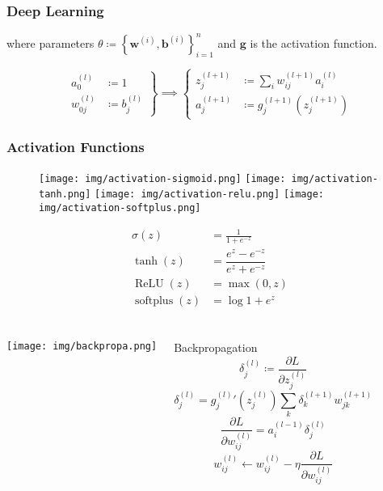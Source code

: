 \documentclass[UTF8,11pt,colorlinks,compress,openany]{beamer}%
\begin{document}
\begin{frame}\frametitle{Deep Learning}
	\begin{center}
	\end{center}
	where parameters $\theta\coloneqq \left\{\mathbf{w}^{(i)},\mathbf{b}^{(i)}\right\}_{i=1}^n$ and $\mathbf{g}$ is the activation function.
	\begin{block}{}
		\[
		\left.\begin{aligned}
		a_0^{(l)}&\coloneqq 1\\
		w_{0j}^{(l)}&\coloneqq b_j^{(l)}
		\end{aligned}\right\}\implies\left\{
		\begin{aligned}
		z_j^{(l+1)}&\coloneqq \sum\limits_i w_{ij}^{(l+1)}a_i^{(l)}\\
		a_j^{(l+1)}&\coloneqq g_j^{(l+1)}\left(z_j^{(l+1)}\right)
		\end{aligned}\right.
		\]
	\end{block}
\end{frame}

\begin{frame}\frametitle{Activation Functions}
\begin{figure}[H]
\texttt{[image: img/activation-sigmoid.png]}
\texttt{[image: img/activation-tanh.png]}
\texttt{[image: img/activation-relu.png]}
\texttt{[image: img/activation-softplus.png]}
\end{figure}
\begin{align*}
\sigma(z)&=\frac{1}{1+e^{-z}}\\
\tanh(z)&=\dfrac{e^z-e^{-z}}{e^z+e^{-z}}\\
\operatorname{ReLU}(z)&=\max(0,z)\\
\operatorname{softplus}(z)&=\log 1+e^z
\end{align*}
\end{frame}

\begin{frame}\frametitle{}
	\begin{columns}
			\centering \texttt{[image: img/backpropa.png]}
			\begin{block}{Backpropagation}
				\[\delta_j^{(l)}\coloneqq \frac{\partial L}{\partial z_j^{(l)}}\]
				\[\delta_j^{(l)}={g_j^{(l)}}'\!\left(z_j^{(l)}\right)\sum_k\delta_k^{(l+1)}w_{jk}^{(l+1)}\]
				\[\frac{\partial L}{\partial w_{ij}^{(l)}}=a_i^{(l-1)}\delta_j^{(l)}\]
				\[w_{ij}^{(l)}\gets w_{ij}^{(l)}-\eta\frac{\partial L}{\partial w_{ij}^{(l)}}\]
			\end{block}
	\end{columns}
\end{frame}
\end{document}
